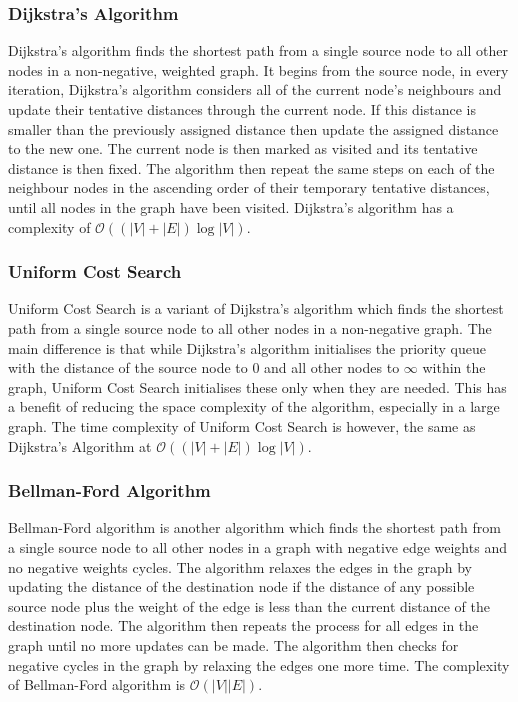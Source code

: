 \subsubsection{Dijkstra's Algorithm}

Dijkstra's algorithm finds the shortest path from a single source node to all other nodes in a non-negative, weighted graph. It begins from the source node, in every iteration, Dijkstra's algorithm considers all of the current node's neighbours and update their tentative distances through the current node. If this distance is smaller than the previously assigned distance then update the assigned distance to the new one. The current node is then marked as visited and its tentative distance is then fixed. The algorithm then repeat the same steps on each of the neighbour nodes in the ascending order of their temporary tentative distances, until all nodes in the graph have been visited. Dijkstra's algorithm has a complexity of $\mathcal{O}((|V|+|E|)\log |V|)$.

\subsubsection{Uniform Cost Search}

Uniform Cost Search is a variant of Dijkstra's algorithm which finds the shortest path from a single source node to all other nodes in a non-negative graph. The main difference is that while Dijkstra's algorithm initialises the priority queue with the distance of the source node to $0$ and all other nodes to $\infty$ within the graph, Uniform Cost Search initialises these only when they are needed. This has a benefit of reducing the space complexity of the algorithm, especially in a large graph. The time complexity of Uniform Cost Search is however, the same as Dijkstra's Algorithm at $\mathcal{O}((|V|+|E|)\log |V|)$.

\subsubsection{Bellman-Ford Algorithm}

Bellman-Ford algorithm is another algorithm which finds the shortest path from a single source node to all other nodes in a graph with negative edge weights and no negative weights cycles. The algorithm relaxes the edges in the graph by updating the distance of the destination node if the distance of any possible source node plus the weight of the edge is less than the current distance of the destination node. The algorithm then repeats the process for all edges in the graph until no more updates can be made. The algorithm then checks for negative cycles in the graph by relaxing the edges one more time. The complexity of Bellman-Ford algorithm is $\mathcal{O}(|V||E|)$.


